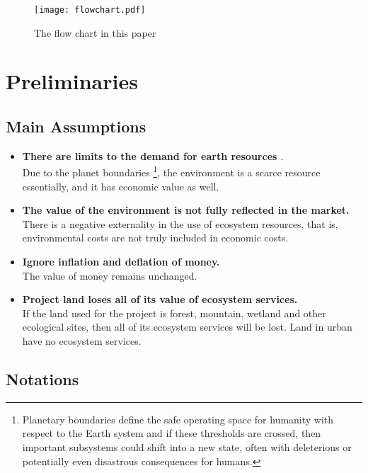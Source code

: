 \documentclass{mcmthesis}
\begin{document}
			\begin{figure}[h]
				\small
				\centering
				\texttt{[image: flowchart.pdf]}
				\caption{The flow chart in this paper}
				\label{fig:flowchart}
			\end{figure}

		
	\section{Preliminaries}
		\subsection{Main Assumptions}
		
			\begin{itemize}
				\item \textbf{There are limits to the demand for earth resources \cite{rockstrom2009safe}}.  \\ 
				Due to the planet boundaries \footnote{Planetary boundaries define the safe operating space for humanity with respect to the Earth system and if these thresholds are crossed, then important subsystems could shift into a new state, often with deleterious or potentially even disastrous consequences for humans.}, the environment is a scarce resource essentially, and it has economic value as well.
				
				\item \textbf{The value of the environment is not fully reflected in the market.}\\
				There is a negative externality in the use of ecosystem resources, that is, environmental costs are not truly included in economic costs.
				
				\item \textbf{Ignore inflation and deflation of money.} 
				\\The value of money remains unchanged.
				
				\item \textbf{Project land loses all of its value of ecosystem services.} \\
				If the land used for the project is forest, mountain, wetland and other ecological sites, then all of its ecosystem services will be lost. Land in urban have no ecosystem services.
				
				
			\end{itemize}
		
		\subsection{Notations}
		
\end{document}
